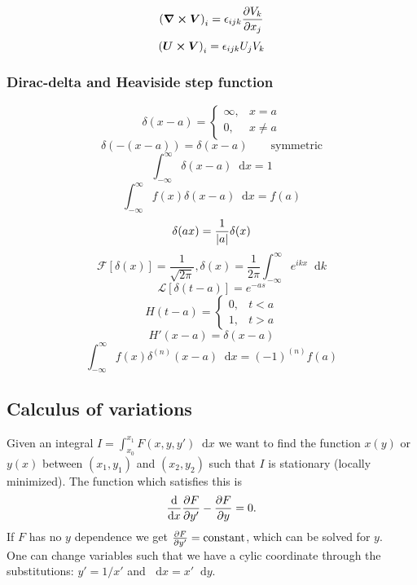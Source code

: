 \documentclass[a4paper, 10pt]{article}
\newcommand*\diff{\mathop{}\!\mathrm{d}}
\begin{document}
\begin{multicols*}{3}
$$ \left( \bm{\nabla} \cross \bm{V}\right)_i = \epsilon_{ijk}\pdv{V_k}{x_j}$$
$$ \left( \bm{U} \cross \bm{V}\right)_i = \epsilon_{ijk}U_jV_k$$

\subsubsection*{Dirac-delta and Heaviside step function}
\[
\delta(x-a)=\begin{cases}
\infty, & x=a \\
0, &  x\neq a
\end{cases}\]
$$ \delta(-(x-a)) = \delta(x-a) \qquad \text{symmetric}$$
$$ \int_{-\infty}^{\infty} \delta(x-a) \diff x = 1$$
$$ \int_{-\infty}^{\infty} f(x) \delta(x-a) \diff x = f(a)$$
$$ \delta(ax) = \frac{1}{\abs{a}}\delta(x)$$
$$ \mathcal{F}\left[ \delta(x) \right] = \frac{1}{\sqrt{2\pi}}, \delta(x) = \frac{1}{2\pi}\int_{-\infty}^{\infty}e^{ikx}\diff k$$
$$ \mathcal{L}\left[ \delta(t-a) \right] = e^{-as}$$
\[
H(t-a)=\begin{cases}
0, & t<a\\
1, & t>a
\end{cases}\]
$$ H'(x-a) = \delta(x-a) $$
$$ \int_{-\infty}^{\infty} f(x) \delta^{(n)}(x-a) \diff x = (-1)^{(n)}f(a)$$



\begin{mdframed}
\subsection*{Calculus of variations}
\end{mdframed}
Given an integral $I=\int_{x_0}^{x_1} F(x, y, y') \diff x$ we want to find the function $x(y)$ or $y(x)$ between $(x_1, y_1)$ and $(x_2, y_2)$ such that $I$ is stationary (locally minimized). The function which satisfies this is
$$ \dv{}{x}\pdv{F}{y'} - \pdv{F}{y} = 0.$$
If $F$ has no $y$ dependence we get $\pdv{F}{y'}=\text{constant}$, which can be solved for $y$. \\
One can change variables such that we have a cylic coordinate through the substitutions: $y' = 1/x'$ and $\diff x = x' \diff y$.
\begin{mdframed}

\end{mdframed}
\end{multicols*}
\end{document}
